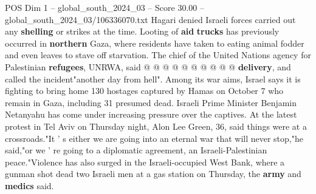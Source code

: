\begin{textsample}{POS Dim 1 – global\_south\_2024\_03 – Score 30.00 – global\_south\_2024\_03/106336070.txt}
Hagari denied Israeli forces carried out any \textbf{shelling} or strikes at the time.
Looting of \textbf{aid} \textbf{trucks} has previously occurred in \textbf{northern} Gaza, where residents have taken to eating animal fodder and even leaves to stave off starvation.
The chief of the United Nations agency for Palestinian \textbf{refugees}, UNRWA, said @ @ @ @ @ @ @ @ @ @ \textbf{delivery}, and called the incident"another day from hell".
Among its war aims, Israel says it is fighting to bring home 130 hostages captured by Hamas on October 7 who remain in Gaza, including 31 presumed dead.
Israeli Prime Minister Benjamin Netanyahu has come under increasing pressure over the captives.
At the latest protest in Tel Aviv on Thursday night, Alon Lee Green, 36, said things were at a crossroads."It ' s either we are going into an eternal war that will never stop,"he said,"or we ' re going to a diplomatic agreement, an Israeli-Palestinian peace."Violence has also surged in the Israeli-occupied West Bank, where a gunman shot dead two Israeli men at a gas station on Thursday, the \textbf{army} and \textbf{medics} said.

\end{textsample}
